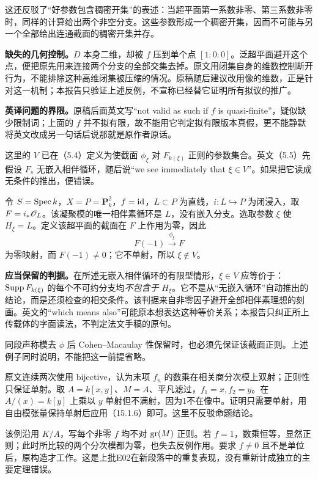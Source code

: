 这还反驳了“好参数包含稠密开集”的表述：当超平面第一系数非零、第三系数非零时，同样的计算给出两个非空分支。这些参数形成一个稠密开集，因而不可能与另一个全部给出连通截面的稠密开集并存。

\textbf{缺失的几何控制。}$D$ 本身二维，却被 $f$ 压到单个点 $[1:0:0]$。泛超平面避开这个点，便把原先用来连接两个分支的全部交集去掉。原文用闭集自身的维数控制断开行为，不能排除这种高维闭集被压缩的情况。原稿随后建议改用像的维数，正是针对这一机制；本报告只验证上述反例，不宣称已经替它证明所有拟议的推广。

\textbf{英译问题的界限。}原稿后面英文写“not valid as such if $f$ is quasi-finite”，疑似缺少限制词；上面的 $f$ 并不拟有限，故不能用它判定拟有限版本真假，更不能静默将英文改成另一句话后说那就是原作者原话。

这里的 $V$ 已在（5.4）定义为使截面 $\phi_\xi$ 对 $F_{k(\xi)}$ 正则的参数集合。英文（5.5）先假设 $F_s$ 无嵌入相伴循环，随后说“we see immediately that $\xi\in V$”。如果把它读成无条件的推出，便错误。

令 $S=\operatorname{Spec} k$，$X=P=\mathbf P^2_k$，$f=\mathrm{id}$，$L\subset P$ 为直线，$i:L\hookrightarrow P$ 为闭浸入，取 $F=i_*\mathscr O_L$。该凝聚模的唯一相伴素循环是 $L$，没有嵌入分支。选取参数 $\xi$ 使 $H_\xi=L$。定义该超平面的截面在 $F$ 上作用为零，因此
\[
 F(-1)\xrightarrow{\phi_\xi}F
\]
为零映射，而 $F(-1)\ne0$；它不单射，所以 $\xi\notin V$。

\textbf{应当保留的判据。}在所述无嵌入相伴循环的有限型情形，$\xi\in V$ 应等价于：$\operatorname{Supp} F_{k(\xi)}$ 的每个不可约分支均\emph{不包含于} $H_\xi$。它不是从“无嵌入循环”自动推出的结论，而是还须检查的相交条件。该判据来自非零因子避开全部相伴素理想的刻画。英文的“which means also”可能原本想表达这种等价关系；本报告只纠正所上传载体的字面读法，不判定法文手稿的原句。

同段声称模去 $\phi$ 后 Cohen--Macaulay 性保留时，也必须先保证该截面正则。上述例子同时说明，不能把这一前提省略。

原文连续两次使用 bijective，认为末项 $f_n$ 的数乘在相关商分次模上双射；正则性只保证单射。取 $A=k[x,y]$、$M=A$、平凡滤过，$f_1=x,f_2=y$。在 $A/(x)=k[y]$ 上乘以 $y$ 单射但不满射，因为1不在像中。证明只需要单射，用自由模张量保持单射后应用（15.1.6）即可。这里不反驳命题结论。

该例沿用 $K/A$，写每个非零 $f$ 均不对 $\operatorname{gr}(M)$ 正则。若 $f=1$，数乘恒等，显然正则；此时所比较的两个分次模都为零，也失去反例作用。要求 $f\ne0$ 且不是单位后，原构造才工作。这是上批E02在新段落中的重复表现，没有重新计成独立的主要定理错误。

